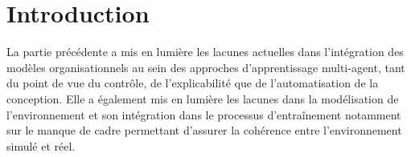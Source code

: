 
\chapter*{Introduction}

\noindent

La partie précédente a mis en lumière les lacunes actuelles dans l'intégration des modèles organisationnels au sein des approches d'apprentissage multi-agent, tant du point de vue du contrôle, de l'explicabilité que de l'automatisation de la conception. Elle a également mis en lumière les lacunes dans la modélisation de l'environnement et son intégration dans le processus d’entraînement notamment sur le manque de cadre permettant d'assurer la cohérence entre l'environnement simulé et réel.

\medskip

